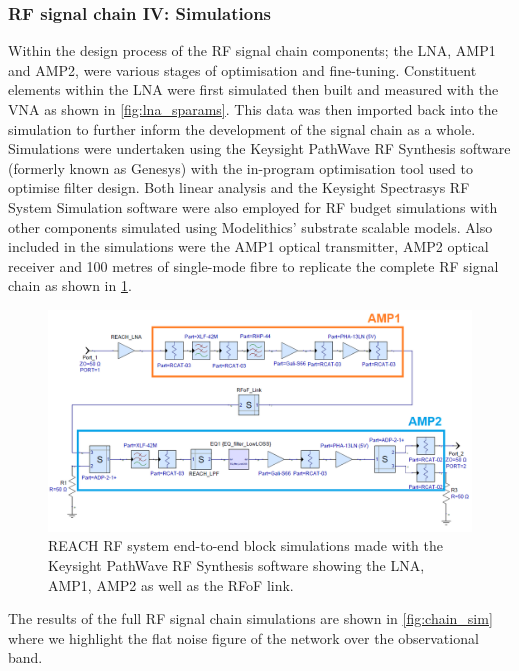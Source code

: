 \subsubsection{RF signal chain IV: Simulations}
Within the design process of the RF signal chain components; the LNA, AMP1 and AMP2, were various stages of optimisation and fine-tuning. Constituent elements within the LNA were first simulated then built and measured with the VNA as shown in \cref{fig:lna_sparams}. This data was then imported back into the simulation to further inform the development of the signal chain as a whole. Simulations were undertaken using the Keysight PathWave RF Synthesis software (formerly known as Genesys) with the in-program optimisation tool used to optimise filter design. Both linear analysis and the Keysight Spectrasys RF System Simulation software were also employed for RF budget simulations with other components simulated using Modelithics’ substrate scalable models. Also included in the simulations were the AMP1 optical transmitter, AMP2 optical receiver and 100 metres of single-mode fibre to replicate the complete RF signal chain as shown in \cref{fig:chain_block_diag}.
\begin{figure}
    \centering
    \includegraphics[width=\textwidth]{chain_block_diag}
    \caption{REACH RF system end-to-end block simulations made with the Keysight PathWave RF Synthesis software showing the LNA, AMP1, AMP2 as well as the RFoF link.}
    \label{fig:chain_block_diag}
\end{figure}
The results of the full RF signal chain simulations are shown in \cref{fig:chain_sim} where we highlight the flat noise figure of the network over the observational band.
